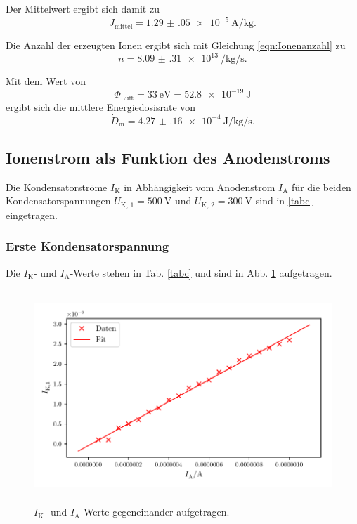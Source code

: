 \noindent Der Mittelwert ergibt sich damit zu 
\begin{equation*}
    \dot{J}_\text{mittel} = \SI{1.29(05)e-5}{\ampere\per\kilo\gram}.
\end{equation*}

\noindent Die Anzahl der erzeugten Ionen ergibt sich mit Gleichung \eqref{eqn:Ionenanzahl} zu 
\begin{equation*}
    n = \SI{8.09(31)e13}{\per\kilo\gram\per\second}.
\end{equation*}

\noindent Mit dem Wert von 
\begin{equation*}
    \Phi_\text{Luft} = \SI{33}{\electronvolt} = \SI{52.8e-19}{\joule}
\end{equation*}
ergibt sich die mittlere Energiedosisrate von 
\begin{equation*}
    \dot{D}_\text{m} = \SI{4.27(16)e-4}{\joule\per\kilo\gram\per\second}.
\end{equation*}



\subsection{Ionenstrom als Funktion des Anodenstroms}

Die Kondensatorströme $I_\text{K}$ in Abhängigkeit vom
Anodenstrom $I_\text{A}$ für die beiden Kondensatorspannungen
$U_\text{K, 1} = \SI{500}{\volt}$ und $U_\text{K, 2} = \SI{300}{\volt}$
sind in \ref{tabc} eingetragen.

\subsubsection{Erste Kondensatorspannung}
Die $I_\text{K}$- und $I_\text{A}$-Werte stehen in Tab. \ref{tabc} und sind in Abb. \ref{fig:plot1} aufgetragen. 



\begin{figure}
    \centering
    \includegraphics[width=15cm, height=8cm]{build/plot1.pdf}
    \caption{$I_\text{K}$- und $I_\text{A}$-Werte gegeneinander aufgetragen.}
    \label{fig:plot1}
\end{figure}

